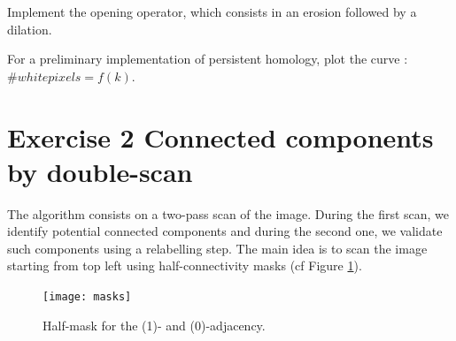 \documentclass[a4paper, 11pt, french]{article}
\begin{document}
Implement the opening operator, which consists in an erosion followed by a dilation.

For a preliminary implementation of persistent homology, plot the curve : $\#white pixels = f(k)$. 



\section*{Exercise 2 \rm Connected components by double-scan}


\par The algorithm consists on a two-pass scan of the image. During the first scan, we identify potential connected components and during the second one, we validate such components using a relabelling step. The main idea is to scan the image starting from top left using half-connectivity masks (cf Figure \ref{fig:masks}).

\begin{figure}
	\begin{center}
	\texttt{[image: masks]}
	\caption{Half-mask for the (1)- and (0)-adjacency.\label{fig:masks}}
	\end{center}
\end{figure}
\end{document}

